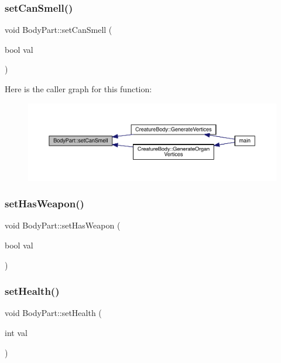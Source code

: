 \subsubsection{\texorpdfstring{set\+Can\+Smell()}{setCanSmell()}}
{\footnotesize\ttfamily void Body\+Part\+::set\+Can\+Smell (\begin{DoxyParamCaption}\item[{bool}]{val }\end{DoxyParamCaption})}

Here is the caller graph for this function\+:
\nopagebreak
\begin{figure}[H]
\begin{center}
\leavevmode
\includegraphics[width=350pt]{d2/d6f/class_body_part_acc147f8434d4bf881ee4b54e1b79c439_icgraph}
\end{center}
\end{figure}
\mbox{\label{class_body_part_a15d3ae087969dc50e7db331c73bd346b}} 
\subsubsection{\texorpdfstring{set\+Has\+Weapon()}{setHasWeapon()}}
{\footnotesize\ttfamily void Body\+Part\+::set\+Has\+Weapon (\begin{DoxyParamCaption}\item[{bool}]{val }\end{DoxyParamCaption})}

\mbox{\label{class_body_part_aca91d2ed2644a952b437a3e1f5155318}} 
\subsubsection{\texorpdfstring{set\+Health()}{setHealth()}}
{\footnotesize\ttfamily void Body\+Part\+::set\+Health (\begin{DoxyParamCaption}\item[{int}]{val }\end{DoxyParamCaption})}


